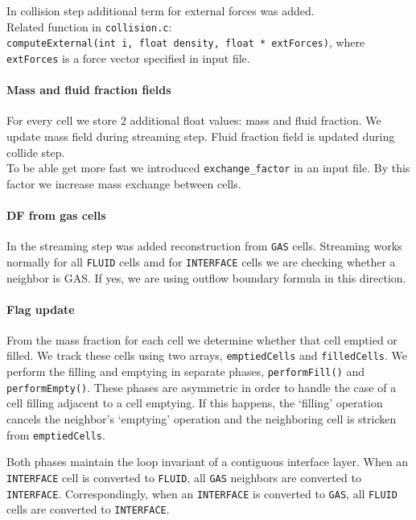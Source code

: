 \documentclass{article}
\begin{document}
In collision step additional term for external forces was added.\\
Related function in \texttt{collision.c}:
\texttt{computeExternal(int\ i,\ float\ density,\ float\ *\ extForces)},
where \texttt{extForces} is a force vector specified in input file.

\paragraph{Mass and fluid fraction
fields}\label{mass-and-fluid-fraction-fields}

For every cell we store 2 additional float values: mass and fluid
fraction. We update mass field during streaming step. Fluid fraction
field is updated during collide step.\\
To be able get more fast we introduced \texttt{exchange\_factor} in an
input file. By this factor we increase mass exchange between cells.

\paragraph{DF from gas cells}\label{df-from-gas-cells}

In the streaming step was added reconstruction from \texttt{GAS} cells.
Streaming works normally for all \texttt{FLUID} cells amd for
\texttt{INTERFACE} cells we are checking whether a neighbor is GAS. If
yes, we are using outflow boundary formula in this direction.

\paragraph{Flag update}\label{flag-update}

From the mass fraction for each cell we determine whether that cell
emptied or filled. We track these cells using two arrays,
\texttt{emptiedCells} and \texttt{filledCells}. We perform the filling
and emptying in separate phases, \texttt{performFill()} and
\texttt{performEmpty()}. These phases are asymmetric in order to handle
the case of a cell filling adjacent to a cell emptying. If this happens,
the `filling' operation cancels the neighbor's `emptying' operation and
the neighboring cell is stricken from \texttt{emptiedCells}.

Both phases maintain the loop invariant of a contiguous interface layer.
When an \texttt{INTERFACE} cell is converted to \texttt{FLUID}, all
\texttt{GAS} neighbors are converted to \texttt{INTERFACE}.
Correspondingly, when an \texttt{INTERFACE} is converted to
\texttt{GAS}, all \texttt{FLUID} cells are converted to
\texttt{INTERFACE}.
\end{document}
